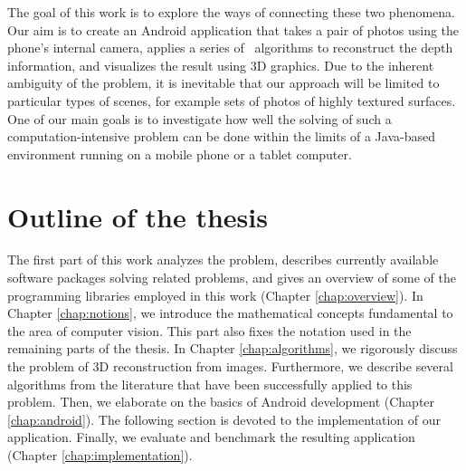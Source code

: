 The goal of this work is to explore the ways of connecting these two phenomena. 
Our aim is to create an Android application that takes a pair of photos using the phone's internal camera, applies a series of \cv\ algorithms to reconstruct the depth information, and visualizes the result using 3D graphics. %
Due to the inherent ambiguity of the problem, it is inevitable that our approach will be limited to particular types of scenes, for example sets of photos of highly textured surfaces. 
One of our main goals is to investigate how well the solving of such a computation-intensive problem can be done within the limits of a Java-based environment running on a mobile phone or a tablet computer.

\section*{Outline of the thesis}

The first part of this work analyzes the problem, describes currently available software packages solving related problems, and gives an overview of some of the programming libraries employed in this work (Chapter \ref{chap:overview}). 
In Chapter \ref{chap:notions}, we introduce the mathematical concepts fundamental to the area of computer vision. 
This part also fixes the notation used in the remaining parts of the thesis. 
In Chapter \ref{chap:algorithms}, we rigorously discuss the problem of 3D reconstruction from images. %
Furthermore, we describe several algorithms from the literature that have been successfully applied to this problem. 
Then, we elaborate on the basics of Android development (Chapter \ref{chap:android}).
The following section is devoted to the implementation of our application.
Finally, we evaluate and benchmark the resulting application (Chapter \ref{chap:implementation}).  %

